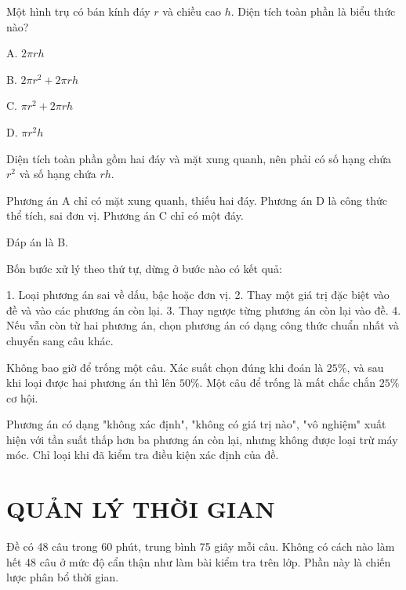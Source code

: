 \documentclass[11pt, a4paper]{article}
\begin{document}
\begin{vidu}[{12}]
Một hình trụ có bán kính đáy $r$ và chiều cao $h$. Diện tích toàn phần là biểu thức nào?

A. $2\pi rh$

B. $2\pi r^2 + 2\pi rh$

C. $\pi r^2 + 2\pi rh$

D. $\pi r^2 h$

Diện tích toàn phần gồm hai đáy và mặt xung quanh, nên phải có số hạng chứa $r^2$ và số hạng chứa $rh$.

Phương án A chỉ có mặt xung quanh, thiếu hai đáy. Phương án D là công thức thể tích, sai đơn vị. Phương án C chỉ có một đáy.

Đáp án là B.

\begin{dinhly}
Bốn bước xử lý theo thứ tự, dừng ở bước nào có kết quả:

1. Loại phương án sai về dấu, bậc hoặc đơn vị.
2. Thay một giá trị đặc biệt vào đề và vào các phương án còn lại.
3. Thay ngược từng phương án còn lại vào đề.
4. Nếu vẫn còn từ hai phương án, chọn phương án có dạng công thức chuẩn nhất và chuyển sang câu khác.

 Không bao giờ để trống một câu. Xác suất chọn đúng khi đoán là $25\%$, và sau khi loại được hai phương án thì lên $50\%$. Một câu để trống là mất chắc chắn $25\%$ cơ hội.

 Phương án có dạng "không xác định", "không có giá trị nào", "vô nghiệm" xuất hiện với tần suất thấp hơn ba phương án còn lại, nhưng không được loại trừ máy móc. Chỉ loại khi đã kiểm tra điều kiện xác định của đề.

\end{dinhly}
\end{vidu}
\section{QUẢN LÝ THỜI GIAN}

Đề có 48 câu trong 60 phút, trung bình 75 giây mỗi câu. Không có cách nào làm hết 48 câu ở mức độ cẩn thận như làm bài kiểm tra trên lớp. Phần này là chiến lược phân bổ thời gian.
\end{document}
